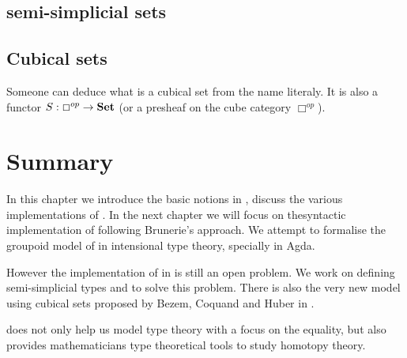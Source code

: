 \subsection{semi-simplicial sets}





\subsection{Cubical sets}

Someone can deduce what is a cubical set from the name literaly. It is
also a functor $S : \Box^{op} \rightarrow \operatorname{\mathbf{Set}}$ (or a presheaf on the
cube category $ \Box^{op}$).

\section{Summary}

In this chapter we introduce the basic notions in \hott, discuss the
various implementations of \hott. In the next chapter we will focus on
thesyntactic implementation of \wog following
Brunerie's approach. We attempt to formalise the groupoid model of
\hott in intensional type theory, specially in Agda.









However the implementation of \hott in \itt is still an open problem. We
work on defining semi-simplicial types and \wog to solve this problem. There
is also the very new model using cubical sets proposed by Bezem,
Coquand and Huber in \cite{bezem2013model}.



\hott does not only help us model type theory with a focus on the equality, but also provides mathematicians type theoretical tools to study homotopy theory.

